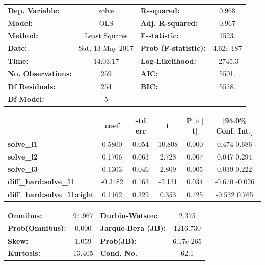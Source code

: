 \documentclass{article}
\begin{document}
\begin{center}
\begin{tabular}{lclc}
\toprule
\textbf{Dep. Variable:}           &      solve       & \textbf{  R-squared:         } &     0.968   \\
\textbf{Model:}                   &       OLS        & \textbf{  Adj. R-squared:    } &     0.967   \\
\textbf{Method:}                  &  Least Squares   & \textbf{  F-statistic:       } &     1523.   \\
\textbf{Date:}                    & Sat, 13 May 2017 & \textbf{  Prob (F-statistic):} & 4.62e-187   \\
\textbf{Time:}                    &     14:03:17     & \textbf{  Log-Likelihood:    } &   -2745.3   \\
\textbf{No. Observations:}        &         259      & \textbf{  AIC:               } &     5501.   \\
\textbf{Df Residuals:}            &         254      & \textbf{  BIC:               } &     5518.   \\
\textbf{Df Model:}                &           5      & \textbf{                     } &             \\
\bottomrule
\end{tabular}
\begin{tabular}{lccccc}
                                  & \textbf{coef} & \textbf{std err} & \textbf{t} & \textbf{P$>$$|$t$|$} & \textbf{[95.0\% Conf. Int.]}  \\
\midrule
\textbf{solve\_l1}                 &       0.5800  &        0.054     &    10.808  &         0.000        &         0.474     0.686       \\
\textbf{solve\_l2}                 &       0.1706  &        0.063     &     2.728  &         0.007        &         0.047     0.294       \\
\textbf{solve\_l3}                 &       0.1303  &        0.046     &     2.809  &         0.005        &         0.039     0.222       \\
\textbf{diff\_hard:solve\_l1}       &      -0.3482  &        0.163     &    -2.131  &         0.034        &        -0.670    -0.026       \\
\textbf{diff\_hard:solve\_l1:right} &       0.1162  &        0.329     &     0.353  &         0.725        &        -0.532     0.765       \\
\bottomrule
\end{tabular}
\begin{tabular}{lclc}
\textbf{Omnibus:}       & 94.967 & \textbf{  Durbin-Watson:     } &     2.375  \\
\textbf{Prob(Omnibus):} &  0.000 & \textbf{  Jarque-Bera (JB):  } &  1216.730  \\
\textbf{Skew:}          &  1.059 & \textbf{  Prob(JB):          } & 6.17e-265  \\
\textbf{Kurtosis:}      & 13.405 & \textbf{  Cond. No.          } &      62.1  \\
\bottomrule
\end{tabular}
\end{center}
\end{document}
